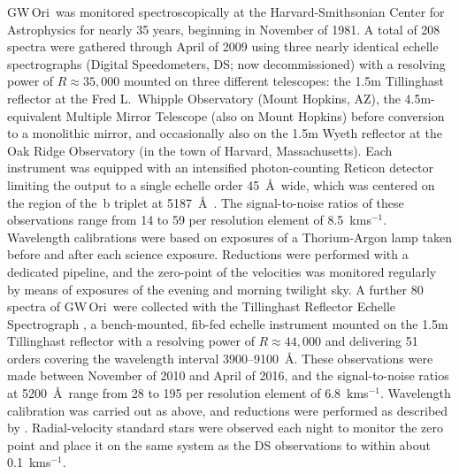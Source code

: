\documentclass[twocolumn]{aastex6}
\newcommand\kms{\ifmmode{\rm km\thinspace s^{-1}}\else km\thinspace s$^{-1}$\fi}
\newcommand{\gw}{GW\,Ori}
\begin{document}
\gw\ was monitored spectroscopically at the Harvard-Smithsonian Center
for Astrophysics for nearly 35 years, beginning in November of 1981. A
total of 208 spectra were gathered through April of 2009 using three
nearly identical echelle spectrographs (Digital Speedometers, DS; now
decommissioned) with a resolving power of $R \approx 35,000$ mounted
on three different telescopes: the 1.5m Tillinghast reflector at the
Fred L.\ Whipple Observatory (Mount Hopkins, AZ), the 4.5m-equivalent
Multiple Mirror Telescope (also on Mount Hopkins) before conversion to
a monolithic mirror, and occasionally also on the 1.5m Wyeth reflector
at the Oak Ridge Observatory (in the town of Harvard,
Massachusetts). Each instrument was equipped with an intensified
photon-counting Reticon detector limiting the output to a single
echelle order 45~\AA\ wide, which was centered on the region of the
\,b triplet at 5187~\AA\ \citep[see][]{Latham1992}. The
signal-to-noise ratios of these observations range from 14 to 59 per
resolution element of 8.5~\kms. Wavelength calibrations were based on
exposures of a Thorium-Argon lamp taken before and after each science
exposure. Reductions were performed with a dedicated pipeline, and the
zero-point of the velocities was monitored regularly by means of
exposures of the evening and morning twilight sky. A further 80
spectra of \gw\ were collected with the Tillinghast Reflector Echelle
Spectrograph \citep[TRES;][]{Furesz2008}, a bench-mounted, fib-fed
echelle instrument mounted on the 1.5m Tillinghast reflector with a
resolving power of $R \approx 44,000$ and delivering 51 orders
covering the wavelength interval 3900--9100~\AA. These observations
were made between November of 2010 and April of 2016, and the
signal-to-noise ratios at 5200~\AA\ range from 28 to 195 per
resolution element of 6.8~\kms. Wavelength calibration was carried out
as above, and reductions were performed as described by
\cite{Buchhave:..}. Radial-velocity standard stars were observed each
night to monitor the zero point and place it on the same system as the
DS observations to within about 0.1~\kms.
\end{document}
